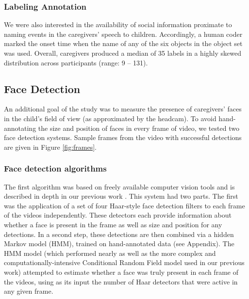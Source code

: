 \documentclass[man,noapacite]{apa2}
\begin{document}
\subsubsection{Labeling Annotation}

We were also interested in the availability of social information proximate to naming events in the caregivers' speech to children. Accordingly, a human coder marked the onset time when the name of any of the six objects in the object set was used. Overall, caregivers produced a median of 35 labels in a highly skewed distribution across participants (range: 9 -- 131).

\subsection{Face Detection}

An additional goal of the study was to measure the presence of caregivers' faces in the child's field of view (as approximated by the headcam). To avoid hand-annotating the size and position of faces in every frame of video, we tested two face detection systems. Sample frames from the video with successful detections are given in Figure \ref{fig:frames}.

\subsubsection{Face detection algorithms}

The first algorithm was based on freely available computer vision tools \cite{bradski2008} and is described in depth in our previous work \cite{frank2012b}. This system had two parts. The first was the application of a set of four Haar-style face detection filters \cite{viola2004} to each frame of the videos independently. These detectors each provide information about whether a face is present in the frame as well as size and position for any detections. In a second step, these detections are then combined via a hidden Markov model (HMM), trained on hand-annotated data (see Appendix). The HMM model (which performed nearly as well as the more complex and computationally-intensive Conditional Random Field model used in our previous work) attempted to estimate whether a face was truly present in each frame of the videos, using as its input the number of Haar detectors that were active in any given frame. 
\end{document}
